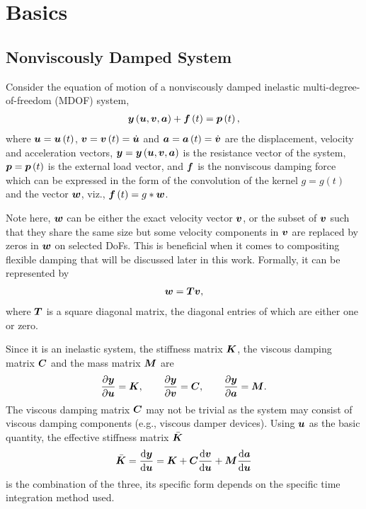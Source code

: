 \section{Basics}
\subsection{Nonviscously Damped System}
Consider the equation of motion of a nonviscously damped inelastic multi-degree-of-freedom (MDOF) system,
\begin{gather}\label{eq:eom}
\bm{y}\left(\bm{u},\bm{v},\bm{a}\right)+\bm{f}\left(t\right)=\bm{p}\left(t\right),
\end{gather}
where $\bm{u}=\bm{u}\left(t\right)$, $\bm{v}=\bm{v}\left(t\right)=\dot{\bm{u}}$ and $\bm{a}=\bm{a}\left(t\right)=\dot{\bm{v}}$ are the displacement, velocity and acceleration vectors, $\bm{y}=\bm{y}\left(\bm{u},\bm{v},\bm{a}\right)$ is the resistance vector of the system, $\bm{p}=\bm{p}\left(t\right)$ is the external load vector, and $\bm{f}$ is the nonviscous damping force which can be expressed in the form of the convolution of the kernel $g=g\left(t\right)$ and the vector $\bm{w}$, viz., $\bm{f}\left(t\right)=g*\bm{w}$.

Note here, $\bm{w}$ can be either the exact velocity vector $\bm{v}$, or the subset of $\bm{v}$ such that they share the same size but some velocity components in $\bm{v}$ are replaced by zeros in $\bm{w}$ on selected DoFs. This is beneficial when it comes to compositing flexible damping that will be discussed later in this work. Formally, it can be represented by
\begin{gather}
\bm{w}=\bm{T}\bm{v},
\end{gather}
where $\bm{T}$ is a square diagonal matrix, the diagonal entries of which are either one or zero.

Since it is an inelastic system, the stiffness matrix $\bm{K}$, the viscous damping matrix $\bm{C}$ and the mass matrix $\bm{M}$ are
\begin{gather}
\dfrac{\partial{\bm{y}}}{\partial{\bm{u}}}=\bm{K},\qquad
\dfrac{\partial{\bm{y}}}{\partial{\bm{v}}}=\bm{C},\qquad
\dfrac{\partial{\bm{y}}}{\partial{\bm{a}}}=\bm{M}.
\end{gather}
The viscous damping matrix $\bm{C}$ may not be trivial as the system may consist of viscous damping components (e.g., viscous damper devices). Using $\bm{u}$ as the basic quantity, the effective stiffness matrix $\bar{\bm{K}}$
\begin{gather}
\bar{\bm{K}}=\dfrac{\mathrm{d}\bm{y}}{\mathrm{d}\bm{u}}=\bm{K}+\bm{C}\dfrac{\mathrm{d}\bm{v}}{\mathrm{d}\bm{u}}+\bm{M}\dfrac{\mathrm{d}\bm{a}}{\mathrm{d}\bm{u}}
\end{gather}
is the combination of the three, its specific form depends on the specific time integration method used.
